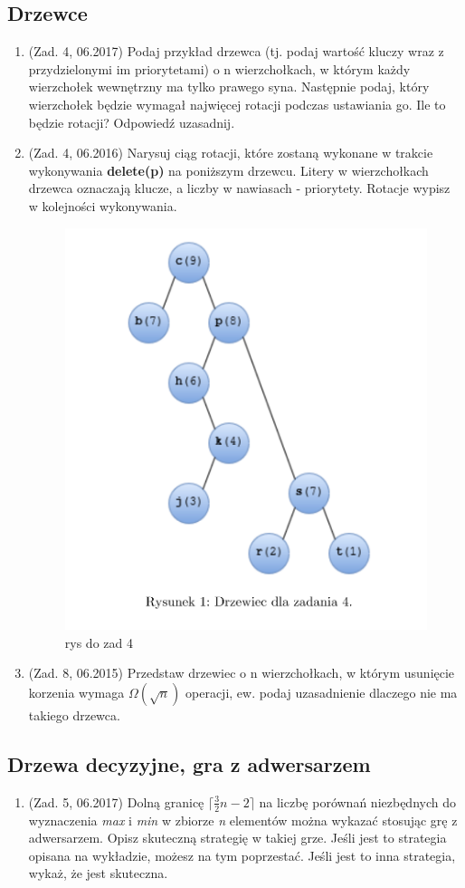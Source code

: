 \documentclass[10pt]{article}%
\begin{document}
\subsection*{Drzewce}
\begin{enumerate}
\item(Zad. 4, 06.2017) Podaj przykład drzewca (tj. podaj wartość kluczy wraz z przydzielonymi im priorytetami) o n wierzchołkach, w którym każdy wierzchołek wewnętrzny ma tylko prawego syna. Następnie podaj, który wierzchołek będzie wymagał najwięcej rotacji podczas ustawiania go. Ile to będzie rotacji? Odpowiedź uzasadnij.

\item (Zad. 4, 06.2016) Narysuj ciąg rotacji, które zostaną wykonane w trakcie wykonywania \textbf{delete(p)} na poniższym drzewcu. Litery w wierzchołkach drzewca oznaczają klucze, a liczby w nawiasach - priorytety. Rotacje wypisz w kolejności wykonywania.
\begin{figure}[H]
\includegraphics[scale=0.8]{z40616.png}
\caption{rys do zad 4}
\end{figure}

\item (Zad. 8, 06.2015) Przedstaw drzewiec o n wierzchołkach, w którym usunięcie korzenia wymaga $\Omega(\sqrt{n})$ operacji, ew. podaj uzasadnienie dlaczego nie ma takiego drzewca.
\end{enumerate}
\subsection*{Drzewa decyzyjne, gra z adwersarzem}
\begin{enumerate}
\item (Zad. 5, 06.2017) Dolną granicę $\lceil \frac{3}{2} n - 2 \rceil $ na liczbę porównań niezbędnych do wyznaczenia \emph{max} i \emph{min} w zbiorze \emph{n} elementów można wykazać stosując grę z adwersarzem. Opisz skuteczną strategię w takiej grze. Jeśli jest to strategia opisana na wykładzie, możesz na tym poprzestać. Jeśli jest to inna strategia, wykaż, że jest skuteczna.
\end{enumerate}
\end{document}
